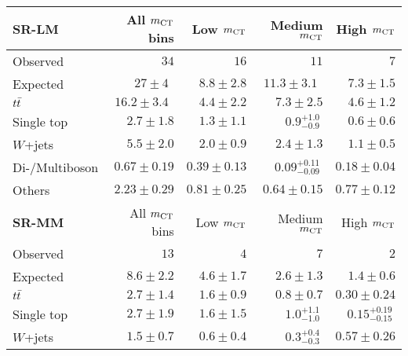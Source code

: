\begin{table}
\begin{center}
{\small
\begin{tabular}{lrrrr}
\toprule
{\textbf{ SR-LM}}           & All $m_{\textrm{CT}}$ bins          & Low $m_{\textrm{CT}}$         & Medium $m_{\textrm{CT}}$        & High $m_{\textrm{CT}}$    \\[-0.05cm]
\midrule
Observed           & $34$              & $16$              & $11$              & $7$                    \\
\midrule
Expected          & $27 \pm 4~~$          & $8.8 \pm 2.8$          & $11.3 \pm 3.1~~$          & $7.3 \pm 1.5$              \\
\midrule
$t\bar{t}$          & $16.2 \pm 3.4~~$          & $4.4 \pm 2.2$          & $7.3 \pm 2.5$          & $4.6 \pm 1.2$              \\
Single top          & $2.7 \pm 1.8$          & $1.3 \pm 1.1$          & $0.9_{-0.9}^{+1.0}~$          & $0.6 \pm 0.6$              \\
$W$+jets           & $5.5 \pm 2.0$          & $2.0 \pm 0.9$          & $2.4 \pm 1.3$          & $1.1 \pm 0.5$              \\
Di-/Multiboson          & $0.67 \pm 0.19$          & $0.39 \pm 0.13$          & $0.09_{-0.09}^{+0.11}~$          & $0.18 \pm 0.04$              \\
Others          & $2.23 \pm 0.29$          & $0.81 \pm 0.25$          & $0.64 \pm 0.15$          & $0.77 \pm 0.12$              \\
\bottomrule
\textbf{ SR-MM}           & All $m_{\textrm{CT}}$ bins          & Low $m_{\textrm{CT}}$         & Medium $m_{\textrm{CT}}$        & High $m_{\textrm{CT}}$    \\[-0.05cm]
\midrule
Observed           & $13$              & $4$              & $7$              & $2$                    \\
\midrule
 Expected          & $8.6 \pm 2.2$          & $4.6 \pm 1.7$          & $2.6 \pm 1.3$          & $1.4 \pm 0.6$              \\
\midrule
$t\bar{t}$          & $2.7 \pm 1.4$          & $1.6 \pm 0.9$          & $0.8 \pm 0.7$          & $0.30 \pm 0.24$              \\
Single top          & $2.7 \pm 1.9$          & $1.6 \pm 1.5$          & $1.0_{-1.0}^{+1.1}~$          & $0.15_{-0.15}^{+0.19}~$              \\
$W$+jets          & $1.5 \pm 0.7$          & $0.6 \pm 0.4$          & $0.3_{-0.3}^{+0.4}~$          & $0.57 \pm 0.26$              \\

\end{tabular}}
\end{center}
\end{table}
